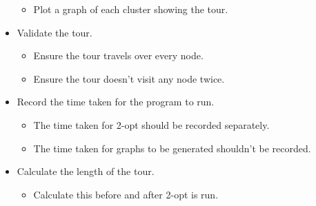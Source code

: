 \begin{itemize}
\begin{itemize}
            \item Plot a graph of each cluster showing the tour.
        \end{itemize}
    \item Validate the tour.
        \begin{itemize}
            \item Ensure the tour travels over every node.
            \item Ensure the tour doesn't visit any node twice.
        \end{itemize}
    \item Record the time taken for the program to run.
        \begin{itemize}
            \item The time taken for 2-opt should be recorded separately.
            \item The time taken for graphs to be generated shouldn't be recorded.
        \end{itemize}
    \item Calculate the length of the tour.
        \begin{itemize}
            \item Calculate this before and after 2-opt is run.
        \end{itemize}
\end{itemize}